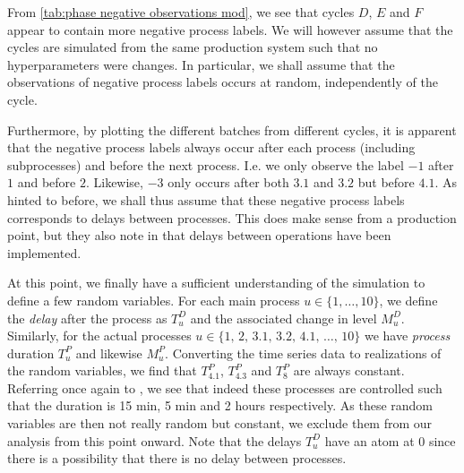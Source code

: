 \documentclass[../Thesis.tex]{subfiles}
\begin{document}
From \autoref{tab:phase negative observations mod}, we see that cycles $D$, $E$ and $F$ appear to contain more negative process labels. We will however assume that the cycles are simulated from the same production system such that no hyperparameters were changes. In particular, we shall assume that the observations of negative process labels occurs at random, independently of the cycle.

Furthermore, by plotting the different batches from different cycles, it is apparent that the negative process labels always occur after each process (including subprocesses) and before the next process. I.e. we only observe the label $-1$ after $1$ and before $2$. Likewise, $-3$ only occurs after both $3.1$ and $3.2$ but before $4.1$. As hinted to before, we shall thus assume that these negative process labels corresponds to delays between processes. This does make sense from a production point, but they also note in \cite{benchmark-model-to-generate-batch-process-data} that delays between operations have been implemented.

At this point, we finally have a sufficient understanding of the simulation to define a few random variables. For each main process $u\in \{1,\dots, 10\}$, we define the \textit{delay} after the process as $T^D_u$ and the associated change in level $M^D_u$. Similarly, for the actual processes $u \in \{1,\,2,\,3.1,\,3.2,\,4.1,\,\dots,\,10\}$ we have \textit{process} duration $T^P_u$ and likewise $M^P_u$. Converting the time series data to realizations of the random variables, we find that $T^P_{4.1}$, $T^P_{4.3}$ and $T^P_8$ are always constant. Referring once again to \cite{benchmark-model-to-generate-batch-process-data}, we see that indeed these processes are controlled such that the duration is 15 min, 5 min and 2 hours respectively. As these random variables are then not really random but constant, we exclude them from our analysis from this point onward. Note that the delays $T^D_u$ have an atom at $0$ since there is a possibility that there is no delay between processes.
\end{document}
